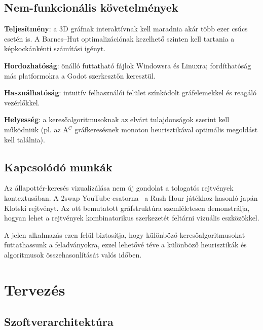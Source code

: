 \subsection{Nem-funkcionális követelmények}

\begin{compactitem}
\item \textbf{Teljesítmény}: a 3D gráfnak interaktívnak kell maradnia akár több ezer csúcs esetén is. A Barnes–Hut optimalizációnak kezelhető szinten kell tartania a képkockánkénti számítási igényt.
\item \textbf{Hordozhatóság}: önálló futtatható fájlok Windowsra és Linuxra; fordíthatóság más platformokra a Godot szerkesztőn keresztül.
\item \textbf{Használhatóság}: intuitív felhasználói felület színkódolt gráfelemekkel és reagáló vezérlőkkel.
\item \textbf{Helyesség}: a keresőalgoritmusoknak az elvárt tulajdonságok szerint kell működniük (pl. az A$^C$ gráfkeresésnek monoton heurisztikával optimális megoldást kell találnia).
\end{compactitem}

\subsection{Kapcsolódó munkák}

Az állapottér-keresés vizualizálása nem új gondolat a tologatós rejtvények kontextusában. A 2swap YouTube-csatorna~\cite{2swap_klotski} a Rush Hour játékhoz hasonló japán Klotski rejtvényt. Az ott bemutatott gráfstruktúra szemléletesen demonstrálja, hogyan lehet a rejtvények kombinatorikus szerkezetét feltárni vizuális eszközökkel.

A jelen alkalmazás ezen felül biztosítja, hogy különböző keresőalgoritmusokat futtathassunk a feladványokra, ezzel lehetővé téve a különböző heurisztikák és algoritmusok összehasonlítását valós időben.


\section{Tervezés}

\subsection{Szoftverarchitektúra}

